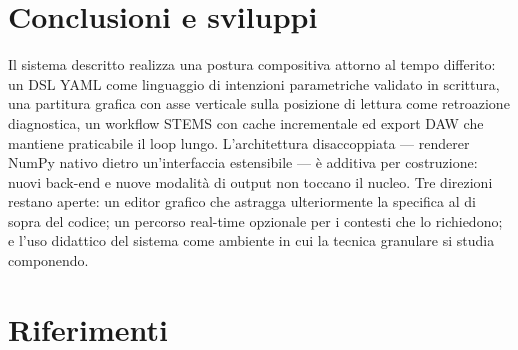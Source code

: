 \documentclass[10pt,twocolumn,a4paper]{article}
\begin{document}
\section{Conclusioni e sviluppi}

Il sistema descritto realizza una postura compositiva attorno al tempo
differito: un DSL YAML come linguaggio di intenzioni parametriche
validato in scrittura, una partitura grafica con asse verticale sulla
posizione di lettura come retroazione diagnostica, un workflow STEMS con
cache incrementale ed export DAW che mantiene praticabile il loop lungo.
L'architettura disaccoppiata --- renderer NumPy nativo dietro
un'interfaccia estensibile --- è additiva per costruzione: nuovi
back-end e nuove modalità di output non toccano il nucleo. Tre direzioni
restano aperte: un editor grafico che astragga ulteriormente la
specifica al di sopra del codice; un percorso real-time opzionale per i
contesti che lo richiedono; e l'uso didattico del sistema come ambiente
in cui la tecnica granulare si studia componendo.

\section*{Riferimenti}


\end{document}
